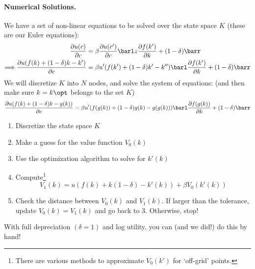 \documentclass[10pt]{article}
\begin{document}
\paragraph{Numerical Solutions.} We have a set of non-linear equations to be solved over the state space $K$ (these are our Euler equations):
\begin{align*}
	\frac{\partial u(c)}{\partial c} &= \beta \frac{\partial u(c')}{\partial c} \barl z \frac{\partial f(k')}{\partial k} + (1-\delta)\barr \\\Longrightarrow \frac{\partial u(f(k) + (1-\delta)k-k')}{\partial c} &= \beta u'(f(k')+ (1-\delta)k' - k'')\barl \frac{\partial f(k')}{\partial k} + (1-\delta)\barr
\end{align*}
We will discretize $K$ into $N$ nodes, and solve the system of equations: (and then make sure $k = k\opt$ belongs to the set $K$)
\[
\frac{\partial u(f(k) + (1-\delta)k - g(k))}{\partial c} = \beta u'(f(g(k)) + (1-\delta)g(k) - g(g(k))) \barl \frac{\partial f(g(k))}{\partial k} + (1-\delta)\barr
\]

\begin{algorithm}
	
	\begin{enumerate}
		\item Discretize the state space $K$
		\item Make a guess for the value function $V_0(k)$
		\item Use the optimization algorithm to solve for $k'(k)$
		\item Compute\footnote{There are various methods to approximate $V_0(k')$ for `off-grid' points.} \[V_1(k) = u(f(k) + k(1-\delta) - k'(k)) + \beta V_0(k'(k))\]
		\item Check the distance between $V_0(k)$ and $V_1(k)$. If larger than the tolerance, update $V_0(k) = V_1(k)$ and go back to 3. Otherwise, stop!
	\end{enumerate}
\end{algorithm}
\begin{remark}
	With full depreciation $(\delta = 1)$ and log utility, you can (and we did!) do this by hand!
\end{remark}
\end{document}

